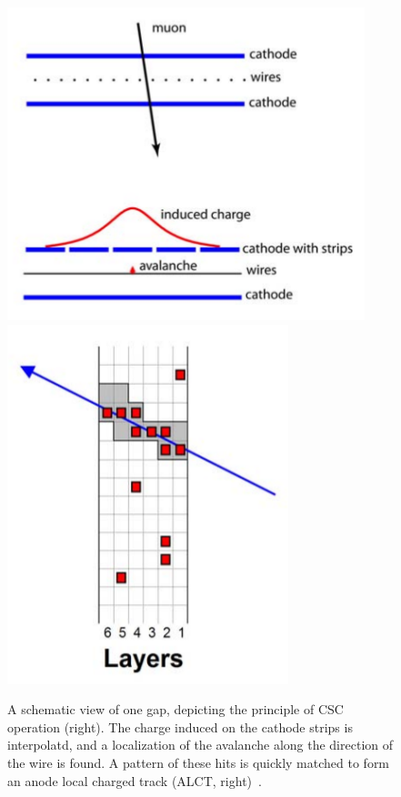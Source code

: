 \begin{figure}[!Hh]
       \centering
       \includegraphics[scale=0.5]{Figures/CSCavalanche.png}
       \includegraphics[scale=0.5]{Figures/CSCalct.png} \\
       \caption[A schematic depiction of an avalanche in a cathode strip chamber and an anode local charged track.]{A schematic view of one gap, depicting the principle of CSC operation (right).  The charge induced on the cathode strips is interpolatd, and a localization of the avalanche along the direction of the wire is found.  A pattern of these hits is quickly matched to form an anode local charged track (ALCT, right)~\cite{CMSdetector}.}
\label{figapp:CSCavalanche}
\end{figure}

